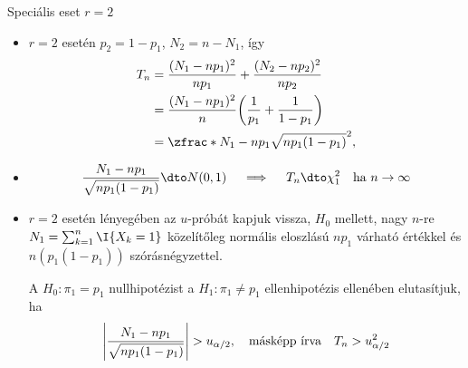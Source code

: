 \documentclass[aspectratio=169,notheorems,9pt,\option]{beamer}
\begin{document}
\begin{frame}{Speciális eset $r=2$}
  
  \begin{itemize}
    \item $r=2$ esetén $p_2=1-p_1$, $N_2=n-N_1$, így
    \begin{align*}
      T_n&=\frac{(N_1-np_1)^2}{np_1}+\frac{(N_2-np_2)^2}{np_2}
      \\
      &=
      \frac{(N_1-np_1)^2}n \zjel*{\frac1{p_1}+\frac1{1-p_1}}
      \\
      &
      =\zfrac*{N_1-np_1}{\sqrt{np_1(1-p_1)}}^2,\\
    \end{align*}
    \item  
    \begin{displaymath}
      \frac{N_1-np_1}{\sqrt{np_1 (1-p_1)}}\dto N (0,1)
      \quad\implies\quad
      T_n\dto \chi^2_1\quad\text{ha $n\to\infty$}
    \end{displaymath}
    \item $r=2$ esetén lényegében az $u$-próbát kapjuk vissza,
    $H_0$ mellett, nagy $n$-re $N_1=\sum_{k=1}^n\I{X_k=1}$ közelítőleg normális eloszlású 
    $np_1$ várható értékkel és $n(p_1(1-p_1))$ szórásnégyzettel.
    
    A $H_0: \pi_1=p_1$ nullhipotézist a $H_1: \pi_1\neq p_1$ ellenhipotézis
    ellenében elutasítjuk, ha
    \begin{displaymath}
      \abs*{\frac{N_1-np_1}{\sqrt{np_1 (1-p_1)}}}>u_{\alpha/2},\quad
      \text{másképp írva}\quad 
      T_n>u^2_{\alpha/2}
    \end{displaymath}
  \end{itemize}
\end{frame}
\end{document}
